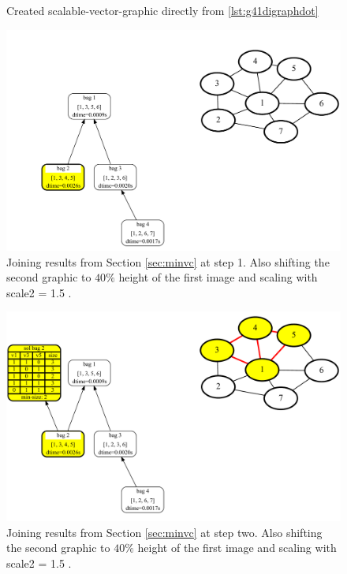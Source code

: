 \documentclass[a4paper, 12pt, bibliography=totoc]{scrartcl}
\begin{document}
\begin{figure}[H]
	\caption{Created scalable-vector-graphic directly from \ref{lst:g41digraphdot}}
	\label{fig:g41Digraph}
\end{figure}



\begin{figure}[H]
	\centering
	\includegraphics[width=0.9\linewidth,height=0.9\textheight,keepaspectratio]{images/SVGJOIN/default_06sc151.pdf}
	\caption[Joining results from Section \ref{sec:minvc} at step 1/5]{Joining results from Section \ref{sec:minvc} at step 1. Also shifting the second graphic to $40\%$ height of the first image and scaling with scale2 = 1.5 .}
	\label{fig:joinscaled1}
\end{figure}
\begin{figure}[H]
	\centering
	\includegraphics[width=0.9\linewidth,height=0.9\textheight,keepaspectratio]{images/SVGJOIN/default_06sc152.pdf}
	\caption[Joining results from Section \ref{sec:minvc} at step 2/5]{Joining results from Section \ref{sec:minvc} at step two. Also shifting the second graphic to $40\%$ height of the first image and scaling with scale2 = 1.5 .}
	\label{fig:joinscaled2}
\end{figure}
\end{document}
